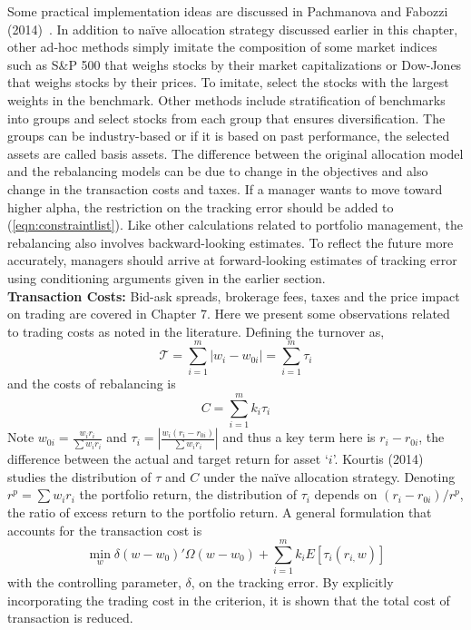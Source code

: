 Some practical implementation ideas are discussed in Pachmanova and Fabozzi (2014)~\cite{pachfab}. In addition to na\"ive allocation strategy discussed earlier in this chapter, other ad-hoc methods simply imitate the composition of some market indices such as S\&P 500 that weighs stocks by their market capitalizations or Dow-Jones that weighs stocks by their prices. To imitate, select the stocks with the largest weights in the benchmark. Other methods include stratification of benchmarks into groups and select stocks from each group that ensures diversification. The groups can be industry-based or if it is based on past performance, the selected assets are called basis assets. The difference between the original allocation model and the rebalancing models can be due to change in the objectives and also change in the transaction costs and taxes. If a manager wants to move toward higher alpha, the restriction on the tracking error should be added to (\ref{eqn:constraintlist}). Like other calculations related to portfolio management, the rebalancing also involves backward-looking estimates. To reflect the future more accurately, managers should arrive at forward-looking estimates of tracking error using conditioning arguments given in the earlier section. \\


\noindent\textbf{Transaction Costs:} Bid-ask spreads, brokerage fees, taxes and the price impact on trading are covered in Chapter 7. Here we present some observations related to trading costs as noted in the literature. Defining the turnover as,
	\begin{equation}\label{eqn:turnover}
	\mathcal{T}= \sum_{i=1}^m |w_i - w_{0i}| = \sum_{i=1}^m \tau_i
	\end{equation}
and the costs of rebalancing is
	\begin{equation}\label{eqn:rebalance}
	C= \sum_{i=1}^m k_i \tau_i
	\end{equation}
Note $w_{0i}=\frac{w_i r_i}{\sum w_i r_i}$ and $\tau_i= \left|\frac{w_i(r_i-r_{0i})}{\sum w_ir_i}\right|$ and thus a key term here is $r_i-r_{0i}$, the difference between the actual and target return for asset `$i$'. Kourtis (2014)~\cite{kourtis} studies the distribution of $\tau$ and $C$ under the na\"ive allocation strategy. Denoting $r^p=\sum w_ir_i$ the portfolio return, the distribution of $\tau_i$ depends on $(r_i-r_{0i})/r^p$, the ratio of excess return to the portfolio return. A general formulation that accounts for the transaction cost is
	\begin{equation}\label{eqn:transcostaccount}
	\min_w \delta (w-w_0)' \Omega(w-w_0) + \sum_{i=1}^m k_i E[\tau_i (r_{i,}w)]
	\end{equation}
with the controlling parameter, $\delta$, on the tracking error. By explicitly incorporating the trading cost in the criterion, it is shown that the total cost of transaction is reduced.


